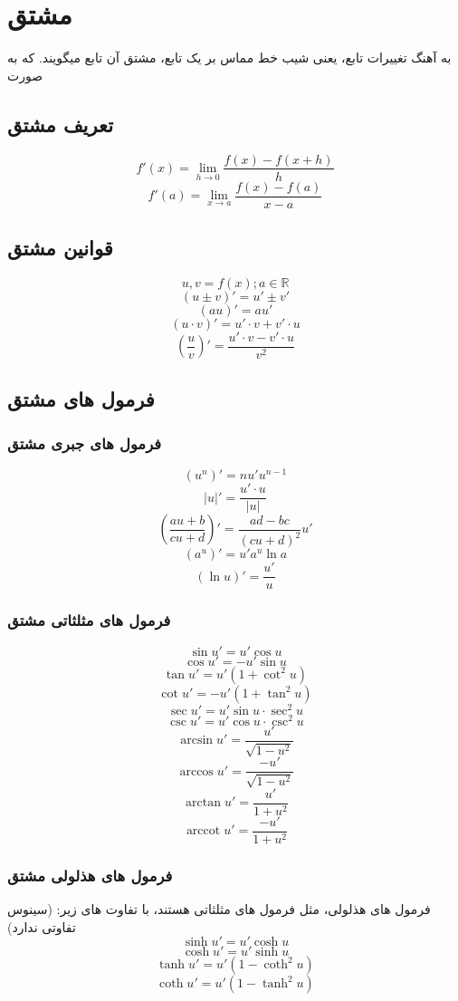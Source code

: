 \documentclass[fleqn,12pt, a4paper, oneside]{article}
\DeclareMathOperator{\arccot}{arccot}
\begin{document}
\tableofcontents
\newpage
\section{مشتق}
به آهنگ تغییرات تابع، یعنی شیب خط مماس بر یک تابع، مشتق آن تابع میگویند. که به صورت 
\subsection{تعریف مشتق}
    \[ f'(x) = \lim_{h\to 0} \frac{f(x)-f(x+h)}{h} \]
    \[ f'(a) = \lim_{x\to a} \frac{f(x)-f(a)}{x-a} \]

\subsection{قوانین مشتق}
    \[u,v = f(x); a \in \mathbb{R} \]
    \[ (u\pm v)'=u'\pm v' \]
    \[ (au)'=au'\]
    \[(u \cdot v)'=u'\cdot v+v' \cdot u\]
    \[(\frac{ u }{ v })'=\frac{u'\cdot v-v' \cdot u}{v^2}\]
\subsection{فرمول های مشتق}
    \subsubsection{فرمول های جبری مشتق}
    \[(u^n)'=nu'u^{n-1}\]
    \[|u|' = \frac{u'\cdot u}{|u|}\]
    \[(\frac{ au+b }{ cu+d })'=\frac{ad-bc}{(cu+d)^2}u'\]
    \[(a^u)'=u'a^u\ln{a}\]
    \[(\ln u)' = \frac{u'}{u}\]
    \subsubsection{فرمول های مثلثاتی مشتق}
    \[ \sin{u}' = u'\cos{u}\]
    \[ \cos{u}' = -u'\sin{u}\]
    \[ \tan{u}' = u'(1+\cot^2{u})\]
    \[ \cot{u}' = -u'(1+\tan^2{u})\]
    \[ \sec{u}' = u'\sin{u}\cdot\sec^2{u}\]
    \[ \csc{u}' = u'\cos{u}\cdot\csc^2{u}\]
    \[\arcsin{u}' = \frac{u'}{\sqrt{1-u^2}}\]
    \[\arccos{u}' = \frac{-u'}{\sqrt{1-u^2}}\]
    \[\arctan{u}' = \frac{u'}{1+u^2}\]
    \[\arccot{u}' = \frac{-u'}{1+u^2}\]
    \subsubsection{فرمول های هذلولی مشتق}
    فرمول های هذلولی،‌ مثل فرمول های مثلثاتی هستند، با تفاوت های زیر: (سینوس تفاوتی ندارد)
    \[ \sinh{u}' = u'\cosh{u}\]
    \[ \cosh{u}' = u'\sinh{u}\]
    \[ \tanh{u}' = u'(1-\coth^2{u})\]
    \[ \coth{u}' = u'(1-\tanh^2{u})\]
\end{document}

